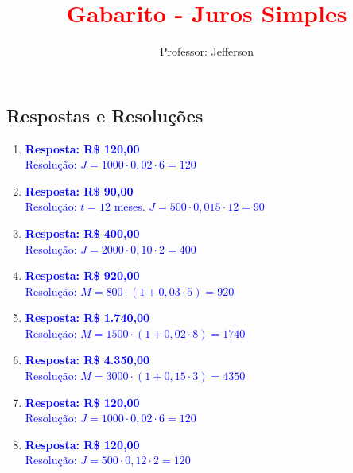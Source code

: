 \documentclass[11pt]{article}
\title{\textbf{\textcolor{red}{Gabarito - Juros Simples}}}
\author{Professor: Jefferson}
\date{}
\begin{document}
\maketitle
\vspace{-0.5cm}

\begin{multicols}{2}

\section*{Respostas e Resoluções}

\begin{enumerate}[leftmargin=*, itemsep=2pt]

\item \textcolor{blue}{\textbf{Resposta: R\$ 120,00}} \\
\textcolor{blue}{Resolução: $J = 1000 \cdot 0,02 \cdot 6 = 120$}

\item \textcolor{blue}{\textbf{Resposta: R\$ 90,00}} \\
\textcolor{blue}{Resolução: $t = 12$ meses. $J = 500 \cdot 0,015 \cdot 12 = 90$}

\item \textcolor{blue}{\textbf{Resposta: R\$ 400,00}} \\
\textcolor{blue}{Resolução: $J = 2000 \cdot 0,10 \cdot 2 = 400$}

\item \textcolor{blue}{\textbf{Resposta: R\$ 920,00}} \\
\textcolor{blue}{Resolução: $M = 800 \cdot (1 + 0,03 \cdot 5) = 920$}

\item \textcolor{blue}{\textbf{Resposta: R\$ 1.740,00}} \\
\textcolor{blue}{Resolução: $M = 1500 \cdot (1 + 0,02 \cdot 8) = 1740$}

\item \textcolor{blue}{\textbf{Resposta: R\$ 4.350,00}} \\
\textcolor{blue}{Resolução: $M = 3000 \cdot (1 + 0,15 \cdot 3) = 4350$}

\item \textcolor{blue}{\textbf{Resposta: R\$ 120,00}} \\
\textcolor{blue}{Resolução: $J = 1000 \cdot 0,02 \cdot 6 = 120$}

\item \textcolor{blue}{\textbf{Resposta: R\$ 120,00}} \\
\textcolor{blue}{Resolução: $J = 500 \cdot 0,12 \cdot 2 = 120$}


\end{enumerate}
\end{multicols}
\end{document}

